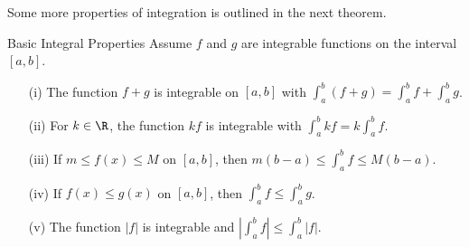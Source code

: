 Some more properties of integration is outlined in the next theorem.

\begin{theorem}{Basic Integral Properties}{}
	Assume \( f  \) and \( g  \)  are integrable functions on the interval \( [a,b]  \).
	\begin{enumerate}
		\item[(i)] The function \( f + g  \) is integrable on \( [a,b]  \) with \( \int_{ a }^{ b } (f + g) = \int_{ a }^{ b }  f + \int_{ a }^{ b } g  \).
		\item[(ii)] For \( k \in \R  \), the function \( kf  \) is integrable with \( \int_{ a }^{ b } kf  = k \int_{ a }^{ b }  f. \)
		\item[(iii)] If \( m \leq f(x) \leq M  \) on \( [a,b]  \), then \( m(b-a) \leq \int_{ a }^{ b } f \leq M(b-a) \).
		\item[(iv)] If \( f(x) \leq g(x)  \) on \( [a,b]  \), then \( \int_{ a }^{ b } f  \leq \int_{ a }^{ b } g  \).
		\item[(v)] The function \( | f |   \) is integrable and \( | \int_{ a }^{ b }  f | \leq \int_{ a }^{ b } | f |. \) 
	\end{enumerate}
\end{theorem}

